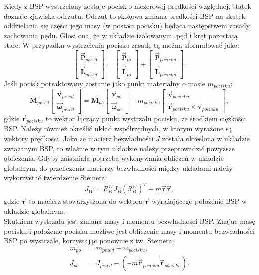 Kiedy z BSP wystrzelony zostaje pocisk o niezerowej prędkości względnej, statek doznaje zjawiska odrzutu. Odrzut to skokowa zmiana prędkości BSP na skutek oddzielania się części jego masy (w postaci pocisku) będąca następstwem zasady zachowania pędu. Głosi ona, że w układzie izolowanym, pęd i kręt pozostają stałe. W przypadku wystrzelenia pocisku zasadę tą można sformułować jako:
\[
	\begin{bmatrix}
	\vec{\bm{p}}_{przed}\\
	\vec{\bm{L}}_{przed}
	\end{bmatrix}
	=
	\begin{bmatrix}
	\vec{\bm{p}}_{po}\\
	\vec{\bm{L}}_{po}
	\end{bmatrix}
	+	
	\begin{bmatrix}
	\vec{\bm{p}}_{pocisku}\\
	\vec{\bm{L}}_{pocisku}
	\end{bmatrix}.	
\]
Jeśli pocisk potraktowany zostanie jako punkt materialny o masie $m_{pocisku}$:
\[
	\bm{M}_{przed}
	\begin{bmatrix}
	\vec{\bm{v}}_{przed}\\
	\vec{\bm{\omega}}_{przed}
	\end{bmatrix}
	=
	\bm{M}_{po}
	\begin{bmatrix}
	\vec{\bm{v}}_{po}\\
	\vec{\bm{\omega}}_{po}
	\end{bmatrix}
	+
	m_{pocisku}
	\begin{bmatrix}
	\vec{\bm{v}}_{pocisku}\\
	\vec{\bm{r}}_{pocisku} \times  \vec{\bm{v}}_{pocisku}
	\end{bmatrix},
\]
gdzie $\vec{\bm{r}}_{pocisku}$ to wektor łączący punkt wystrzału pocisku, ze środkiem ciężkości BSP. Należy również określić układ współrzędnych, w którym wyrażone są wektory prędkości. Jako że macierz bezwładności $J$ została określona w układzie związanym BSP, to właśnie w tym układzie należy przeprowadzić powyższe obliczenia. Gdyby zaistniała potrzeba wykonywania obliczeń w układzie globalnym, do przeliczenia macierzy bezwładności między układami należy wykorzystać twierdzenie Steinera:
\[
	J_W = R_B^W J_B (R_B^W)^T - m \tilde{\vec{\bm{r}}} \tilde{\vec{\bm{r}}},
\]
gdzie $ \tilde{\vec{\bm{r}}}$ to macierz stowarzyszona do wektora $\vec{\bm{r}}$ wyrażającego położenie BSP w układzie globalnym.\\

Skutkiem wystrzału jest zmiana masy i momentu bezwładności BSP. Znając masę pocisku i położenie pocisku możliwe jest obliczenie masy i momentu bezwładności BSP po wystrzale, korzystając ponownie z tw. Steinera:
\[
	\begin{aligned}
	m_{po} & = m_{przed} - m_{pocisku},\\
	J_{po} & = J_{przed}  - ( - m \tilde{\vec{\bm{r}}}_{pocisku} \tilde{\vec{\bm{r}}}_{pocisku} ). 
	\end{aligned}
\]

